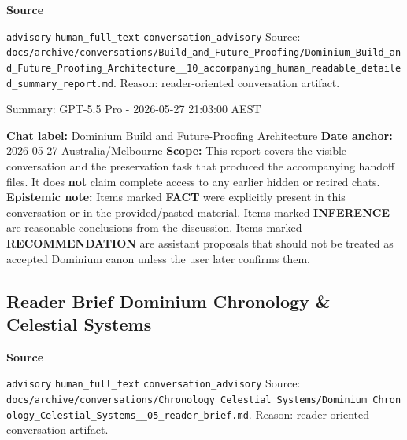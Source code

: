 \documentclass[9pt,a4paper,openany]{book}
\newcommand{\vonecallout}[3]{\par\medskip\noindent\begingroup\setlength{\fboxsep}{7pt}\colorbox{DomCalloutBg}{\parbox{0.94\linewidth}{\textbf{\textcolor{#1}{#2}}\par #3}}\endgroup\par\medskip}
\begin{document}
\vonecallout{DomSlate}{Source}{\texttt{advisory} \texttt{human\_\allowbreak{}full\_\allowbreak{}text} \texttt{conversation\_\allowbreak{}advisory} Source: \texttt{docs/\allowbreak{}archive/\allowbreak{}conversations/\allowbreak{}Build\_\allowbreak{}and\_\allowbreak{}Future\_\allowbreak{}Proofing/\allowbreak{}Dominium\_\allowbreak{}Build\_\allowbreak{}and\_\allowbreak{}Future\_\allowbreak{}Proofing\_\allowbreak{}Architecture\_\allowbreak{}\_\allowbreak{}10\_\allowbreak{}accompanying\_\allowbreak{}human\_\allowbreak{}readable\_\allowbreak{}detailed\_\allowbreak{}summary\_\allowbreak{}report.\allowbreak{}md}.\allowbreak{} Reason: reader-\allowbreak{}oriented conversation artifact.\allowbreak{}}

Summary: GPT-\allowbreak{}5.\allowbreak{}5 Pro -\allowbreak{} 2026-\allowbreak{}05-\allowbreak{}27 21:03:00 AEST


\textbf{Chat label:} Dominium Build and Future-\allowbreak{}Proofing Architecture \textbf{Date anchor:} 2026-\allowbreak{}05-\allowbreak{}27 Australia/\allowbreak{}Melbourne \textbf{Scope:} This report covers the visible conversation and the preservation task that produced the accompanying handoff files.\allowbreak{} It does \textbf{not} claim complete access to any earlier hidden or retired chats.\allowbreak{} \textbf{Epistemic note:} Items marked \textbf{FACT} were explicitly present in this conversation or in the provided/\allowbreak{}pasted material.\allowbreak{} Items marked \textbf{INFERENCE} are reasonable conclusions from the discussion.\allowbreak{} Items marked \textbf{RECOMMENDATION} are assistant proposals that should not be treated as accepted Dominium canon unless the user later confirms them.\allowbreak{}



\subsection{Reader Brief Dominium Chronology \& Celestial Systems}

\vonecallout{DomSlate}{Source}{\texttt{advisory} \texttt{human\_\allowbreak{}full\_\allowbreak{}text} \texttt{conversation\_\allowbreak{}advisory} Source: \texttt{docs/\allowbreak{}archive/\allowbreak{}conversations/\allowbreak{}Chronology\_\allowbreak{}Celestial\_\allowbreak{}Systems/\allowbreak{}Dominium\_\allowbreak{}Chronology\_\allowbreak{}Celestial\_\allowbreak{}Systems\_\allowbreak{}\_\allowbreak{}05\_\allowbreak{}reader\_\allowbreak{}brief.\allowbreak{}md}.\allowbreak{} Reason: reader-\allowbreak{}oriented conversation artifact.\allowbreak{}}
\end{document}
